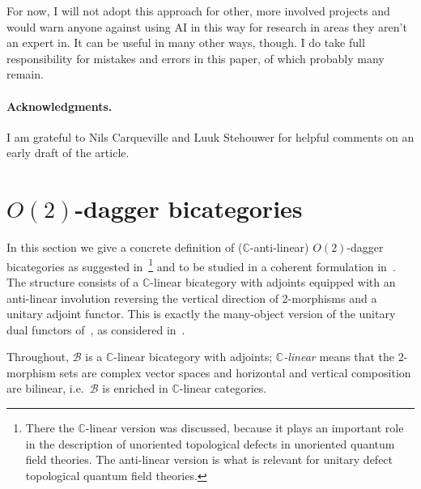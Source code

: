 \documentclass[11pt]{article}
\theoremstyle{definition}
\newcommand{\cB}{\mathcal{B}}
\newcommand{\bC}{\mathbb{C}}
\newcommand{\Or}{O} %
\begin{document}
For now, I will not adopt this approach for other, more involved projects and would warn anyone against using AI in this way for research in areas they aren't an expert in. It can be useful in many other ways, though. I do take full responsibility for mistakes and errors in this paper, of which probably many remain.


\paragraph{Acknowledgments.} 
I am grateful to Nils Carqueville and Luuk Stehouwer for helpful comments on an early draft of the article.  



\section{\texorpdfstring{$\Or(2)$}{O(2)}-dagger bicategories}
\label{sec:strictO2}

In this section we give a concrete definition of ($\bC$-anti-linear) $\Or(2)$-dagger bicategories as suggested in~\cite[Example~3.6]{Mue25}\footnote{There the $\bC$-linear version was discussed, because it plays an important role in the description of unoriented topological defects in unoriented quantum field theories. The anti-linear version is what is relevant for unitary defect topological quantum field theories.} and to be studied in a coherent formulation in~\cite{MS25}. The structure consists of a $\bC$-linear bicategory with adjoints equipped with an anti-linear involution reversing the vertical direction of 2-morphisms and a unitary adjoint functor. This is exactly the many-object version of the unitary dual functors of~\cite{Pen20}, as considered in~\cite{CHFHS24}.

Throughout, $\cB$ is a $\bC$-linear bicategory with adjoints; \emph{$\bC$-linear} means that the 2-morphism sets are complex vector spaces and horizontal and vertical composition are bilinear, i.e.\ $\cB$ is enriched in $\bC$-linear categories.
\end{document}
